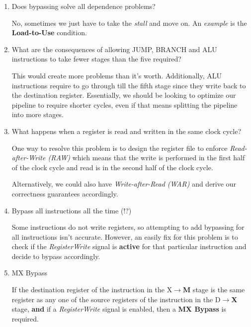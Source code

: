 \documentclass[12pt]{article}
\newenvironment{QandA}{\begin{enumerate}[label=\bfseries\alph*.]\bfseries}
                      {\end{enumerate}}
\newenvironment{answered}{\par\quad\normalfont}{}
\begin{document}
\begin{QandA}
   \item Does bypassing solve all dependence problems?
   \begin{answered}
   No, sometimes we just have to take the \textit{stall} and move on. An \textit{example} is the \textbf{Load-to-Use} condition. 
   \end{answered}
   
   \item What are the consequences of allowing JUMP, BRANCH and ALU instructions to take fewer stages than the five required?
   \begin{answered}
   This would create more problems than it's worth. Additionally, ALU instructions require to go through till the fifth stage since they write back to the destination register. Essentially, we should be looking to optimize our pipeline to require shorter cycles, even if that means splitting the pipeline into more stages.
   \end{answered}
   
   \item What happens when a register is read and written in the same clock cycle?
   \begin{answered}
   One way to resolve this problem is to design the register file to enforce \textit{Read-after-Write (RAW)} which means that the write is performed in the first half of the clock cycle and read is in the second half of the clock cycle. 
   
   Alternatively, we could also have \textit{Write-after-Read (WAR)} and derive our correctness guarantees accordingly. 
   \end{answered}
   
   \item Bypass all instructions all the time (!?)
   \begin{answered}
   Some instructions do not write registers, so attempting to add bypassing for all instructions isn't accurate. However, an easily fix for this problem is to check if the \textit{RegisterWrite} signal is \textbf{active} for that particular instruction and decide to bypass accordingly. 
   \end{answered}
   
   \item MX Bypass
   \begin{answered}
   If the destination register of the instruction in the X$\rightarrow$\textbf{M} stage is the same register as any one of the source registers of the instruction in the D$\rightarrow$\textbf{X} stage, \textbf{and} if a \textit{RegisterWrite} signal is enabled, then a \textbf{MX Bypass} is required.  
   

\end{answered}
\end{QandA}
\end{document}

